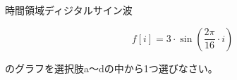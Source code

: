 時間領域ディジタルサイン波 

\[
f[i] = 3 \cdot \sin \left ( \frac{2 \pi}{16}  \cdot i \right )
\]

\noindent のグラフを選択肢a〜dの中から1つ選びなさい。
